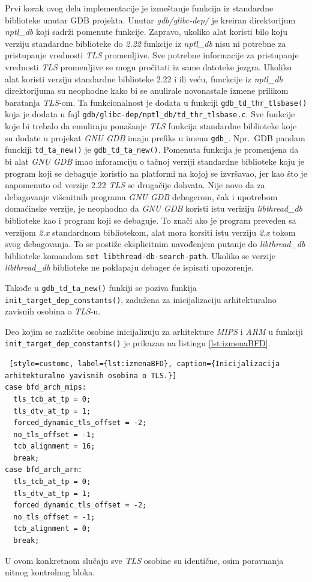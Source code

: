 \documentclass[12pt,oneside]{memoir}
\begin{document}
Prvi korak ovog dela implementacije je izmeštanje funkcija iz standardne biblioteke unutar GDB projekta. Unutar \emph{gdb/glibc-dep/} je kreiran direktorijum \emph{nptl\_db} koji sadrži pomenute funkcije. Zapravo, ukoliko alat koristi bilo koju verziju standardne biblioteke do \emph{2.22} funkcije iz \emph{nptl\_db} nisu ni potrebne za pristupanje vrednosti \emph{TLS} promenljive. Sve potrebne informacije za pristupanje vrednosti \emph{TLS} promenljive se mogu pročitati iz same datoteke jezgra. Ukoliko alat koristi verziju standardne biblioteke 2.22 i ili veću, funckcije iz \emph{nptl\_db} direktorijuma su neophodne kako bi se anulirale novonastale izmene prilikom baratanja \emph{TLS}-om. Ta funkcionalnost je dodata u funkciji \texttt{gdb\_td\_thr\_tlsbase()} koja je dodata u fajl \texttt{gdb/glibc-dep/nptl\_db/td\_thr\_tlsbase.c}.
Sve funkcije koje bi trebalo da emuliraju ponašanje \emph{TLS} funkcija standardne biblioteke koje su dodate u projekat \emph{GNU GDB} imaju prefiks u imenu \texttt{gdb\_}. Npr.~GDB pandam funckiji \texttt{td\_ta\_new()} je \texttt{gdb\_td\_ta\_new()}. Pomenuta funkcija je promenjena da bi alat \emph{GNU GDB} imao inforamciju o tačnoj verziji standardne biblioteke koju je program koji se debaguje koristio na platformi na kojoj se izvršavao, jer kao što je napomenuto od verzije 2.22 \emph{TLS} se drugačije dohvata. Nije novo da za debagovanje višenitnih programa \emph{GNU GDB} debagerom, čak i upotrebom domaćinske verzije, je neophodno da \emph{GNU GDB} koristi istu veriziju \emph{libthread\_db} biblioteke kao i program koji se debaguje. To znači ako je program preveden sa verzijom \emph{2.x} standardnom bibliotekom, alat mora korsiti istu verziju \emph{2.x} tokom svog debagovanja. To se postiže eksplicitnim navođenjem putanje do \emph{libthread\_db} biblioteke komandom \texttt{set libthread-db-search-path}. Ukoliko se verzije \emph{libthread\_db} biblioteke ne poklapaju debager će ispisati upozorenje.

Takođe u \texttt{gdb\_td\_ta\_new()} funkiji se poziva funkija \texttt{init\_target\_dep\_constants()}, zadužena za inicijalizaciju arhitekturalno zavisnih osobina o \emph{TLS}-u.

Deo kojim se različite osobine inicijalizuju za arhitekture \emph{MIPS} i \emph{ARM} u funkciji \texttt{init\_target\_dep\_constants()} je prikazan na listingu \ref{lst:izmenaBFD}.
\begin{lstlisting} [style=customc, label={lst:izmenaBFD}, caption={Inicijalizacija arhitekturalno yavisnih osobina o TLS.}]
case bfd_arch_mips:
  tls_tcb_at_tp = 0;
  tls_dtv_at_tp = 1;
  forced_dynamic_tls_offset = -2;
  no_tls_offset = -1;
  tcb_alignment = 16;
  break;
case bfd_arch_arm:
  tls_tcb_at_tp = 0;
  tls_dtv_at_tp = 1;
  forced_dynamic_tls_offset = -2;
  no_tls_offset = -1;
  tcb_alignment = 0;
  break;
\end{lstlisting}
U ovom konkretnom slučaju sve \emph{TLS} osobine su identične, osim poravnanja nitnog kontrolnog bloka.
\end{document}
